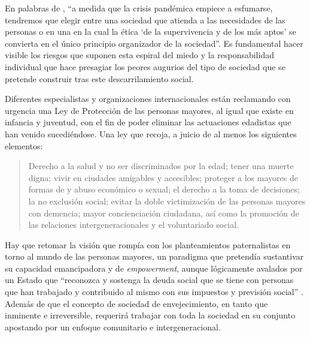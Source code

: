 \documentclass[spanish]{textolivre}
\begin{document}
En palabras de \textcite[p. 11]{giroux2020}, %
“a medida que la crisis pandémica empiece a esfumarse, tendremos que elegir entre una sociedad que atienda a las necesidades de las personas o en una en la cual la ética ‘de la supervivencia y de los más aptos’ se convierta en el único principio organizador de la sociedad”. Es fundamental hacer visible los riesgos que suponen esta espiral del miedo y la responsabilidad individual que hace presagiar los peores augurios del tipo de sociedad que se pretende construir tras este descarrilamiento social.

Diferentes especialistas y organizaciones internacionales están reclamando con urgencia una Ley de Protección de las personas mayores, al igual que existe en infancia y juventud, con el fin de poder eliminar las actuaciones edadistas que han venido sucediéndose. Una ley que recoja, a juicio de \textcite[p. 155]{deusalad2020} %
al menos los siguientes elementos:

\begin{quote}
    Derecho a la salud y no ser discriminados por la edad; tener una muerte digna; vivir en 	ciudades 	amigables y accesibles; proteger a los mayores de formas de y abuso económico o sexual; el derecho a la toma de decisiones; la no exclusión social; evitar la doble victimización de las personas mayores con demencia; mayor concienciación ciudadana, así como la promoción de las relaciones intergeneracionales y el voluntariado social.
\end{quote}

Hay que retomar la visión que rompía con los planteamientos paternalistas en torno al mundo de las personas mayores, un paradigma que pretendía sustantivar su capacidad emancipadora y de \emph{empowerment}, aunque lógicamente avalados por un Estado que “reconozca y sostenga la deuda social que se tiene con personas que han trabajado y contribuido al mismo con sus impuestos y previsión social” \cite{klein2020}. %
Además de que el concepto de sociedad de envejecimiento, en tanto que inminente e irreversible, requerirá trabajar con toda la sociedad en su conjunto apostando por un enfoque comunitario e intergeneracional.
\end{document}
